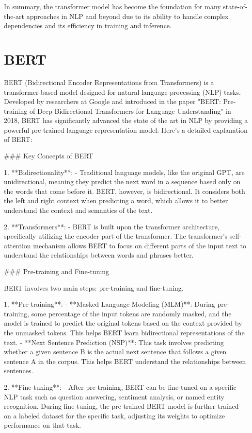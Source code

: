 In summary, the transformer model has become the foundation for many state-of-the-art approaches in NLP and beyond due to its ability to handle complex dependencies and its efficiency in training and inference.

\section{BERT}
BERT (Bidirectional Encoder Representations from Transformers) is a transformer-based model designed for natural language processing (NLP) tasks. Developed by researchers at Google and introduced in the paper "BERT: Pre-training of Deep Bidirectional Transformers for Language Understanding" in 2018, BERT has significantly advanced the state of the art in NLP by providing a powerful pre-trained language representation model. Here's a detailed explanation of BERT:

### Key Concepts of BERT

1. **Bidirectionality**:
   - Traditional language models, like the original GPT, are unidirectional, meaning they predict the next word in a sequence based only on the words that come before it. BERT, however, is bidirectional. It considers both the left and right context when predicting a word, which allows it to better understand the context and semantics of the text.

2. **Transformers**:
   - BERT is built upon the transformer architecture, specifically utilizing the encoder part of the transformer. The transformer’s self-attention mechanism allows BERT to focus on different parts of the input text to understand the relationships between words and phrases better.

### Pre-training and Fine-tuning

BERT involves two main steps: pre-training and fine-tuning.

1. **Pre-training**:
   - **Masked Language Modeling (MLM)**: During pre-training, some percentage of the input tokens are randomly masked, and the model is trained to predict the original tokens based on the context provided by the unmasked tokens. This helps BERT learn bidirectional representations of the text.
   - **Next Sentence Prediction (NSP)**: This task involves predicting whether a given sentence B is the actual next sentence that follows a given sentence A in the corpus. This helps BERT understand the relationships between sentences.

2. **Fine-tuning**:
   - After pre-training, BERT can be fine-tuned on a specific NLP task such as question answering, sentiment analysis, or named entity recognition. During fine-tuning, the pre-trained BERT model is further trained on a labeled dataset for the specific task, adjusting its weights to optimize performance on that task.

